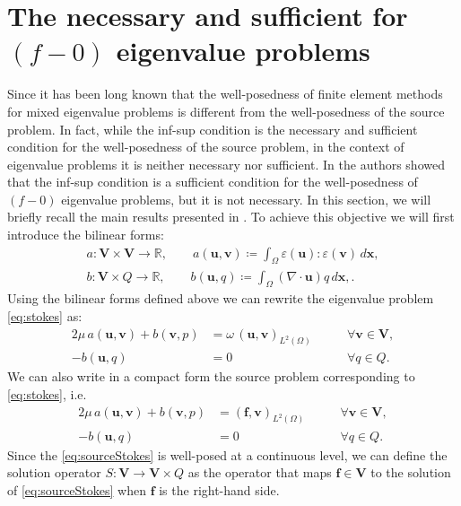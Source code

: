 \documentclass[USenglish]{article}
\theoremstyle{dgthm}
\theoremstyle{dgdef}
\let\vec\bm
\begin{document}
\section{The necessary and sufficient for $(f\!-\!0)$ eigenvalue problems}
Since \cite{BBG} it has been long known that the well-posedness of finite element methods for mixed eigenvalue problems is different from the well-posedness of the source problem.
In fact, while the inf-sup condition is the necessary and sufficient condition for the well-posedness of the source problem, in the context of eigenvalue problems it is neither necessary nor sufficient.
In \cite{BBG} the authors showed that the inf-sup condition is a sufficient condition for the well-posedness of $(f-0)$ eigenvalue problems, but it is not necessary.
In this section, we will briefly recall the main results presented in \cite{BBG}.
To achieve this objective we will first introduce the bilinear forms:
\begin{align}
  a: \vec{V}\times \vec{V}\to \mathbb{R}, \qquad a(\vec{u},\vec{v})\coloneqq\int_{\Omega}\varepsilon(\vec{u}):\varepsilon(\vec{v})\, d\vec{x},\label{eq:a}\\
  b: \vec{V}\times Q\to \mathbb{R}, \qquad b(\vec{u},q)\coloneqq\int_{\Omega} (\nabla\cdot \vec{u})q\, d\vec{x},\label{eq:b}.
\end{align}
Using the bilinear forms defined above we can rewrite the eigenvalue problem \eqref{eq:stokes} as:
\begin{equation}
  \begin{aligned}
    2\mu\, a(\vec{u},\vec{v}) + b(\vec{v},p)&=\omega\, (\vec{u},\vec{v})_{L^2(\Omega)} \qquad &\forall \vec{v}\in \vec{V},\\
    -b(\vec{u},q)&=0 \qquad &\forall q\in Q.
  \end{aligned}
\end{equation}
We can also write in a compact form the source problem corresponding to \eqref{eq:stokes}, i.e.
\begin{equation}
  \label{eq:sourceStokes}
  \begin{aligned}
    2\mu\, a(\vec{u},\vec{v}) + b(\vec{v},p)&=(\vec{f},\vec{v})_{L^2(\Omega)} \qquad &\forall \vec{v}\in \vec{V},\\
    -b(\vec{u},q)&=0 \qquad &\forall q\in Q.
  \end{aligned}
\end{equation}
Since the \eqref{eq:sourceStokes} is well-posed at a continuous level, we can define the solution operator $S:\vec{V}\to \vec{V}\times Q$ as the operator that maps $\vec{f}\in \vec{V}$ to the solution of \eqref{eq:sourceStokes} when $\vec{f}$ is the right-hand side.
\end{document}
